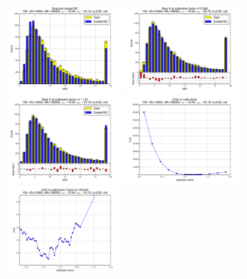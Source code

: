 
 \begin{figure}[htbp] \begin{center} 
\includegraphics[width=0.45\textwidth]{../FIGURES/154/FIG_Data_and_scaled_MC.pdf} 
\includegraphics[width=0.45\textwidth]{../FIGURES/154/FIG_Best_fit_at_calibration_factor_of_0_568.pdf} 
\includegraphics[width=0.45\textwidth]{../FIGURES/154/FIG_Best_fit_at_calibration_factor_of_1_143.pdf} 
\includegraphics[width=0.45\textwidth]{../FIGURES/154/FIG_Chi2_vs_calib_factor.pdf} 
\includegraphics[width=0.45\textwidth]{../FIGURES/154/FIG_Chi2_vs_calib_factor_Zoom_on_chi2min.pdf} 

\end{center}
\end{figure}
